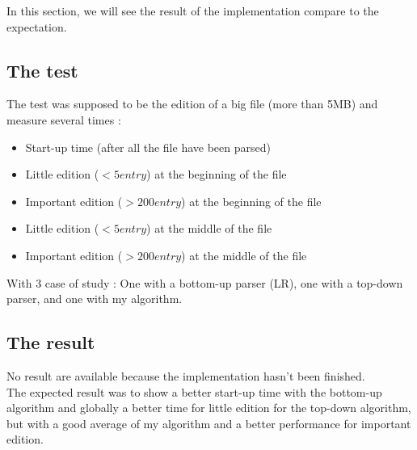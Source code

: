 In this section, we will see the result of the implementation compare to the expectation.

\subsection{The test}
The test was supposed to be the edition of a big file (more than 5MB) and measure several times :
\begin{itemize}
\item Start-up time (after all the file have been parsed)
\item Little edition (\( <5 entry\)) at the beginning of the file
\item Important edition (\(> 200 entry\)) at the beginning of the file
\item Little edition (\( <5 entry\)) at the middle of the file
\item Important edition (\(> 200 entry\)) at the middle of the file 
\end{itemize}
With 3 case of study : One with a bottom-up parser (LR), one with a top-down parser, and one with my algorithm.

\subsection{The result}
No result are available because the implementation hasn't been finished.\\
The expected result was to show a better start-up time with the bottom-up algorithm and globally a better time for little edition for the top-down algorithm, but with a good average of my algorithm and a better performance for important edition.


